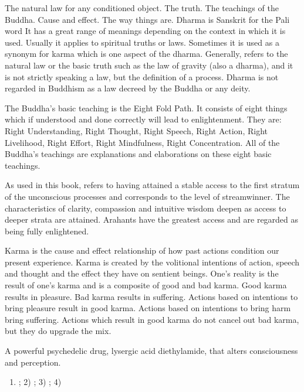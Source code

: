 \documentclass[a5paper,10pt,english]{book}
\begin{document}
\begin{description}
\sphinxAtStartPar
The natural law for any conditioned object. The truth. The
teachings of the Buddha. Cause and effect. The way things are. Dharma is
Sanskrit for the Pali word  It has a great range of
meanings depending on the context in which it is used. Usually it
applies to spiritual truths or laws. Sometimes it is used as a synonym
for karma which is one aspect of the dharma. Generally, 
refers to the natural law or the basic truth such as the law of
gravity (also a dharma), and it is not strictly speaking a law, but the
definition of a process. Dharma is not regarded in Buddhism as a law
decreed by the Buddha or any deity.

\sphinxAtStartPar
The Buddha’s basic teaching is the Eight Fold Path. It
consists of eight things which if understood and done correctly will
lead to enlightenment. They are: Right Understanding, Right Thought,
Right Speech, Right Action, Right Livelihood, Right Effort, Right
Mindfulness, Right Concentration. All of the Buddha’s teachings are
explanations and elaborations on these eight basic teachings.

\sphinxAtStartPar
As used in this book, refers to having attained a stable
access to the first stratum of the unconscious processes and corresponds
to the level of stream\sphinxhyphen{}winner. The characteristics of clarity,
compassion and intuitive wisdom deepen as access to deeper strata are
attained. Arahants have the greatest access and are regarded as being
fully enlightened.

\sphinxAtStartPar
Karma is the cause and effect relationship of how past
actions condition our present experience. Karma is created by the
volitional intentions of action, speech and thought and the effect they
have on sentient beings. One’s reality is the result of one’s karma and
is a composite of good and bad karma. Good karma results in pleasure.
Bad karma results in suffering. Actions based on intentions to bring
pleasure result in good karma. Actions based on intentions to bring harm
bring suffering. Actions which result in good karma do not cancel out
bad karma, but they do upgrade the mix.

\sphinxAtStartPar
A powerful psychedelic drug, lysergic acid diethylamide, that alters
consciousness and perception.

\begin{enumerate}
%
\item {} 
\sphinxAtStartPar
{}; 2) ; 3) ; 4) 


\end{enumerate}
\end{description}
\end{document}
